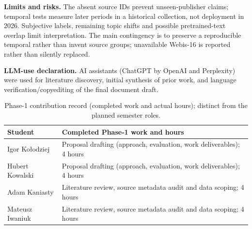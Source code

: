\documentclass[11pt]{article}
\newcommand{\IgorPhaseOne}{Proposal drafting (approach, evaluation, work deliverables); 4 hours}
\newcommand{\HubertPhaseOne}{Proposal drafting (approach, evaluation, work deliverables); 4 hours}
\newcommand{\AdamPhaseOne}{Literature review, source metadata audit and data scoping; 4 hours}
\newcommand{\MateuszPhaseOne}{Literature review, source metadata audit and data scoping; 4 hours}
\begin{document}
\textbf{Limits and risks.} The absent source IDs prevent unseen-publisher claims; temporal tests measure later periods in a historical collection, not deployment in 2026. Subjective labels, remaining topic shifts and possible pretrained-text overlap limit interpretation. The main contingency is to preserve a reproducible temporal rather than invent source groups; unavailable Webis-16 is reported rather than silently replaced.

\textbf{LLM-use declaration.} AI assistants (ChatGPT by OpenAI and Perplexity) were used for literature discovery, initial synthesis of prior work, and language verification/copyediting of the final document draft.

\begin{table}[H]
\caption{Phase-1 contribution record (completed work and actual hours); distinct from the planned semester roles.}
\label{tab:contrib}
\centering\scriptsize
\setlength{\tabcolsep}{3pt}
\begin{tabularx}{\columnwidth}{@{}p{2cm}X@{}}
\toprule
Student & Completed Phase-1 work and hours\\
\midrule
Igor Ko{\l}odziej & \IgorPhaseOne\\
Hubert Kowalski & \HubertPhaseOne\\
Adam Kaniasty & \AdamPhaseOne\\
Mateusz Iwaniuk & \MateuszPhaseOne\\
\bottomrule
\end{tabularx}
\end{table}
\end{document}

